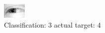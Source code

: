 \begin{figure}[h!]
\begin{center}
\includegraphics[width=0.60\columnwidth]{figures/ID2530_class_3_target_4.png}
\end{center}
\caption{ Classification: 3 actual target: 4}
\label{fig:ID2530_class_3_target_4}
\end{figure}
